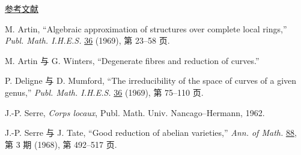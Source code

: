 
\begin{center}
\underline{参考文献}
\end{center}

\begin{enumerate}[label={[\arabic*]},leftmargin=3em]
\item M. Artin, ``Algebraic approximation of structures over complete
local rings,'' \emph{Publ. Math. I.H.E.S.} \underline{36} (1969),
第 23--58 页.

\item M. Artin 与 G. Winters, ``Degenerate fibres and reduction of
curves.''

\item P. Deligne 与 D. Mumford, ``The irreducibility of the space of
curves of a given genus,'' \emph{Publ. Math. I.H.E.S.} \underline{36}
(1969), 第 75--110 页.

\item J.-P. Serre, \emph{Corps locaux}, Publ. Math. Univ.
Nancago--Hermann, 1962.

\item J.-P. Serre 与 J. Tate, ``Good reduction of abelian varieties,''
\emph{Ann. of Math.} \underline{88}, 第 3 期 (1968), 第 492--517 页.
\end{enumerate}

